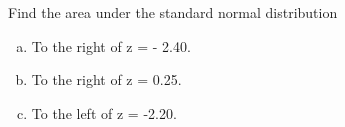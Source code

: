 \documentclass[12pt]{gWmaths}
\begin{document}

\begin{Exercise}
Find the area under the standard normal distribution 
\begin{enumerate}[a.]
\item To the right of z = - 2.40.
\vspace{10 in}
\item To the right of z = 0.25.
\vspace{10 in}


\item To the left of z = -2.20.
\vspace{10 in}
\end{enumerate}
\end{Exercise}
\end{document}
